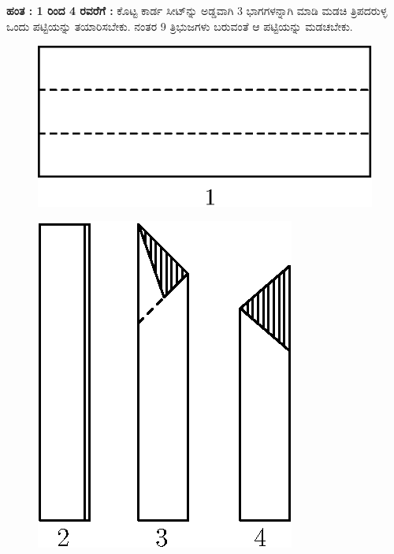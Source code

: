 \begin{enumerate}
 \textbf{ಹಂತ : 1 ರಿಂದ 4 ರವರೆಗೆ  :} ಕೊಟ್ಟ ಕಾರ್ಡ ಸೀಟ್‌ನ್ನು ಅಡ್ಡವಾಗಿ 3 ಭಾಗಗಳ\break ನ್ನಾಗಿ ಮಾಡಿ ಮಡಚಿ ತ್ರಿಪದರುಳ್ಳ ಒಂದು ಪಟ್ಟಿಯನ್ನು ತಯಾರಿಸಬೇಕು. ನಂತರ 9 ತ್ರಿಭುಜಗಳು ಬರುವಂತೆ ಆ ಪಟ್ಟಿಯನ್ನು ಮಡಚಬೇಕು. 
 \begin{figure}[H]
\centering
\includegraphics[scale=.9]{src/figure/chap1/fig1-22a.eps}
\end{figure}
\begin{figure}[H]
\centering
\includegraphics[scale=.9]{src/figure/chap1/fig1-22b.eps}
\end{figure}



\end{enumerate}
